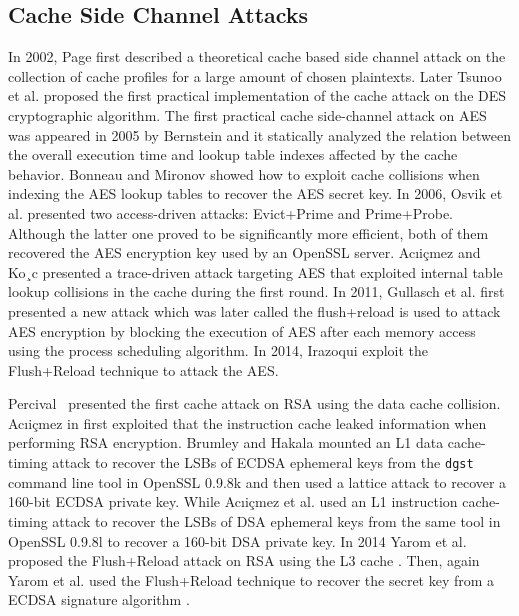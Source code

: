 \subsection{Cache Side Channel Attacks}
In 2002, Page \cite{Page2002} first described a theoretical cache based side channel attack on the collection of cache profiles for a large amount of chosen plaintexts.
Later Tsunoo et al. \cite{Tsunoo2003Cryptanalysis} proposed the first practical implementation of the cache attack on the DES cryptographic algorithm.
The first practical cache side-channel attack on AES was appeared in 2005 by Bernstein \cite{Bernstein2005Cache}
 and it statically analyzed the relation between the overall execution time and lookup table indexes affected by the cache behavior.
Bonneau and Mironov \cite{Bonneau2006} showed how to exploit cache collisions when indexing the AES lookup tables to recover the  AES secret key.
In 2006, Osvik et al. \cite{Osvik2006} presented two access-driven attacks: Evict+Prime and Prime+Probe.
Although the latter one proved to be significantly more efficient, both of them recovered the AES encryption key used by an OpenSSL server.
 Ac{\i}i{\c{c}}mez and Ko¸c \cite{ac2006} presented a trace-driven attack targeting AES that exploited internal table lookup collisions in the cache during the first round.
In 2011, Gullasch et al. \cite{cachegame2011} first presented a new attack which was later called the flush+reload is used to attack AES encryption by blocking the execution of AES after each memory access using the process scheduling algorithm.
In 2014, Irazoqui \cite{Irazoqui2014} exploit the Flush+Reload technique to attack the AES.

Percival~\cite{Percival2005CACHEMF} presented the first cache attack on RSA using the data cache collision.
Ac{\i}i{\c{c}}mez in \cite{Onur2007Yet} first exploited that the instruction cache leaked information when performing RSA encryption.
Brumley and Hakala \cite{Brumley2009} mounted an L1 data cache-timing attack to recover the LSBs of ECDSA ephemeral keys from the \verb+dgst+ command line tool in OpenSSL 0.9.8k and then used a lattice attack to recover a 160-bit ECDSA private key.
 While Ac{\i}i{\c{c}}mez et al. \cite{Brumley2010} used an L1 instruction cache-timing attack to recover the LSBs of DSA ephemeral keys from the same tool in OpenSSL 0.9.8l to recover a 160-bit DSA private key.
 In 2014 Yarom et al. proposed the Flush+Reload attack on RSA using the L3 cache \cite{flushreload}.
  Then, again Yarom et al. used the Flush+Reload technique to recover the secret key from a ECDSA signature algorithm \cite{yarom2014recovering}.

